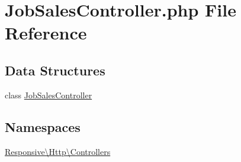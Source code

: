 \hypertarget{_job_sales_controller_8php}{}\section{Job\+Sales\+Controller.\+php File Reference}
\label{_job_sales_controller_8php}
\subsection*{Data Structures}
\begin{DoxyCompactItemize}
\item 
class \mbox{\hyperlink{class_responsive_1_1_http_1_1_controllers_1_1_job_sales_controller}{Job\+Sales\+Controller}}
\end{DoxyCompactItemize}
\subsection*{Namespaces}
\begin{DoxyCompactItemize}
\item 
 \mbox{\hyperlink{namespace_responsive_1_1_http_1_1_controllers}{Responsive\textbackslash{}\+Http\textbackslash{}\+Controllers}}
\end{DoxyCompactItemize}
